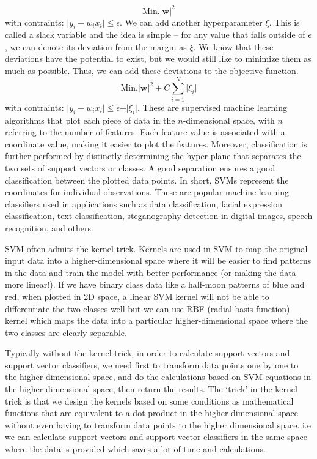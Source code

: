 \documentclass[11pt]{article}
\begin{document}
\begin{itemize}
\begin{equation}
\text{Min.} \vert \textbf{w} \vert^{2} 
\end{equation}
with contraints: $\vert y_{i} - w_{i} x_{i}\vert  \le \epsilon $. 
We can add another hyperparameter $\xi$. This is called a slack variable and the idea is simple -- for any value that falls outside of $\epsilon$, we can denote its deviation from the margin as $\xi$. 
We know that these deviations have the potential to exist, but we would still like to minimize them as much as possible. Thus, we can add these deviations to the objective function.
\begin{equation}
\text{Min.} \vert \textbf{w} \vert^{2}  + C \sum_{i=1}^{N} \vert \xi_i \vert
\end{equation}
with contraints: $\vert y_{i} - w_{i} x_{i} \vert  \le \epsilon + \vert \xi_i \vert $.
These are supervised machine learning algorithms that plot each piece of data in the $n$-dimensional space, with $n$ referring to the number of features. Each feature value is associated with a coordinate value, making it easier to plot the features. Moreover, classification is further performed by distinctly determining the hyper-plane that separates the two sets of support vectors or classes. A good separation ensures a good classification between the plotted data points. In short, SVMs represent the coordinates for individual observations. These are popular machine learning classifiers used in applications such as data classification, facial expression classification, text classification, steganography detection in digital images, speech recognition, and others.

SVM often admits the kernel trick. Kernels are used in SVM to map the original input data into a higher-dimensional space 
where it will be easier to find patterns in the data and train the model with better performance (or making the data more linear!). 
If we have binary class data like a half-moon patterns of blue and red, when plotted in 2D space, a linear SVM kernel will not be able to differentiate the two classes well but we can use RBF (radial basis function) kernel which maps the data into a particular higher-dimensional space where the two classes are clearly separable.

Typically without the kernel trick, in order to calculate support vectors and support vector classifiers, we need first to transform data points one by one to the higher dimensional space, and do the calculations based on SVM equations in the higher dimensional space, then return the results. The ‘trick’ in the kernel trick is that we design the kernels based on some conditions as mathematical functions that are equivalent to a dot product in the higher dimensional space without even having to transform data points to the higher dimensional space. i.e we can calculate support vectors and support vector classifiers in the same space where the data is provided which saves a lot of time and calculations.


\end{itemize}
\end{document}
